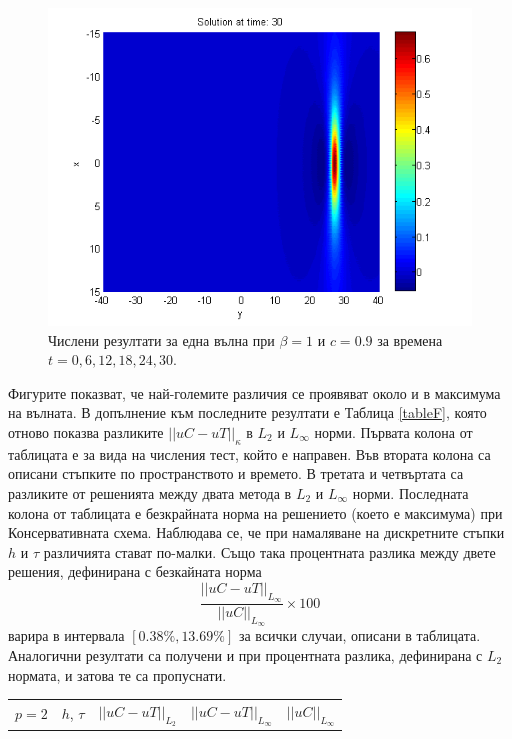 \documentclass[a4paper]{article}
\newcommand{\be}{\begin{equation}}
\newcommand{\ee}{\end{equation}}
\theoremstyle{remark}
\begin{document}
\begin{large}
\begin{figure}[ht]
\begin{minipage}[b]{0.48\linewidth}
		 \includegraphics[width=\linewidth]{../amitans/figures/solution_128x90_bt1_c090_T30.png}
	\end{minipage}
\caption{Числени резултати за една вълна при $\beta=1$ и $c = 0.9$ за времена $t=0,6,12,18,24,30$.}
\label{Wave2}
\end{figure}
\FloatBarrier
Фигурите показват, че най-големите различия се проявяват около и в максимума на вълната. В допълнение към последните резултати е Таблица \ref{tableF}, която отново показва разликите $||uC - uT||_\kappa$ в  $L_2$ и ${L_\infty}$ норми. Първата колона от таблицата е за вида на числения тест, който е направен. Във втората колона са описани стъпките по пространството и времето. В третата и четвъртата са разликите от решенията между двата метода в $L_2$ и ${L_\infty}$ норми. Последната колона от таблицата е безкрайната норма на решението (което е максимума) при Консервативната схема. Наблюдава се, че при намаляване на дискретните стъпки $h$ и $\tau$ различията стават по-малки. Също така процентната разлика между двете решения, дефинирана с безкайната норма
\be\label{solDiffNorm}
\frac{ ||uC - uT||_{L_\infty}} { ||uC||_{L_\infty} } \times 100
\ee
варира в интервала $[0.38\%, 13.69\%]$ за всички случаи, описани в таблицата. Аналогични резултати са получени и при процентната разлика, дефинирана с $L_2$ нормата, и затова те са пропуснати. 
\begin{table}[ht]
\centering
\small
		\begin{tabular}{||c|l|l|l|l||}
			\hline
			\hline
     $p=2$      &$h$, $\tau$  &   $||uC - uT||_{L_2}$     &  $||uC - uT||_{L_\infty}$ & $||uC||_{L_\infty}$ \\

\end{tabular}
\end{table}
\end{large}
\end{document}
